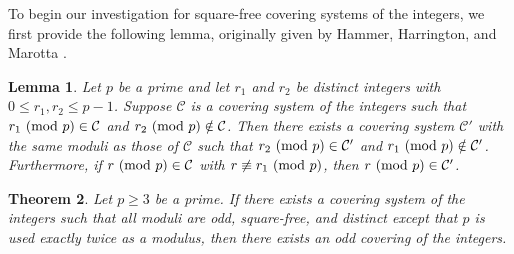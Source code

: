 \documentclass[12pt]{article}
\newtheorem{theorem}{Theorem}[section]
\newtheorem{lemma}[theorem]{Lemma}
\theoremstyle{definition}
\renewcommand{\mod}[2]{#1\textup{ (mod }#2\textup{)}}
\begin{document}
To begin our investigation for square-free covering systems of the integers, we first provide the following lemma, originally given by Hammer, Harrington, and Marotta \cite{hhm}.

\begin{lemma}\label{lem:shifted}
Let $p$ be a prime and let $r_1$ and $r_2$ be distinct integers with $0\leq r_1,r_2\leq p-1$. Suppose $\mathcal{C}$ is a covering system of the integers such that $\mod{r_1}{p}\in\mathcal{C}$ and $\mod{r_2}{p}\notin\mathcal{C}$. Then there exists a covering system $\mathcal{C}'$ with the same moduli as those of $\mathcal{C}$ such that $\mod{r_2}{p}\in\mathcal{C}'$ and $\mod{r_1}{p}\notin\mathcal{C}'$. Furthermore, if $\mod{r}{p}\in\mathcal{C}$ with $r\not\equiv\mod{r_1}{p}$, then $\mod{r}{p}\in\mathcal{C}'$.
\end{lemma}

\begin{theorem}\label{thm:3sqrfreeimpliesodd}
Let $p\geq3$ be a prime. If there exists a covering system of the integers such that all moduli are odd, square-free, and distinct except that $p$ is used exactly twice as a modulus, then there exists an odd covering of the integers.
\end{theorem}
\end{document}
